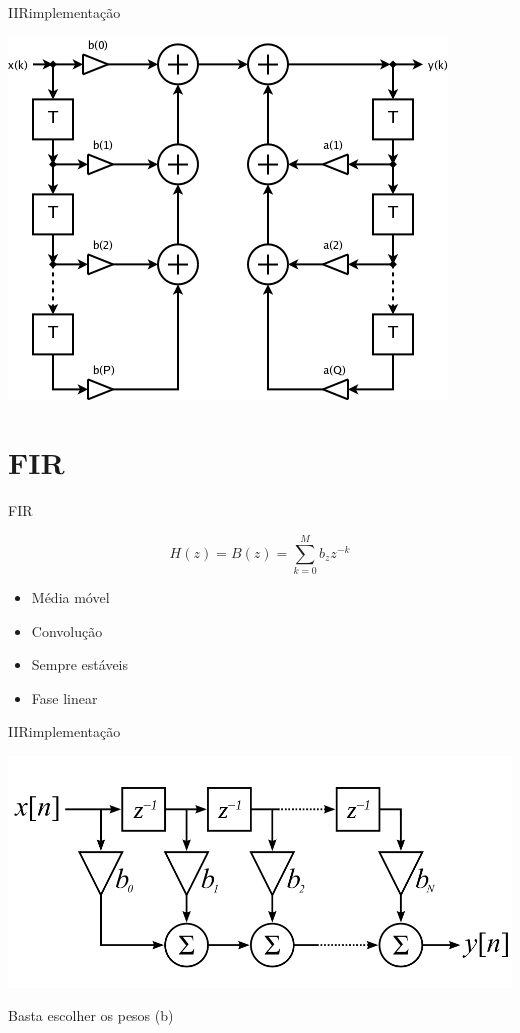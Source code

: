\documentclass{beamer}
\begin{document}
\begin{frame}{IIR}{implementação}
	\begin{center}
	\includegraphics[width=0.7\linewidth]{IIR-filter}
	\end{center}
\end{frame}

\section{FIR}

\begin{frame}{FIR}

	\[
		H(z) = B(z) = \sum_{k=0}^{M} b_z z^{-k}
	\]

	\begin{itemize}
		\item Média móvel
		\item Convolução
		\item Sempre estáveis
		\item Fase linear 
	\end{itemize}
\end{frame}

\begin{frame}{IIR}{implementação}
	\begin{center}
	\includegraphics[width=1\linewidth]{fir-filter}
	\end{center}
	
	Basta escolher os pesos (b)

\end{frame}
\end{document}
